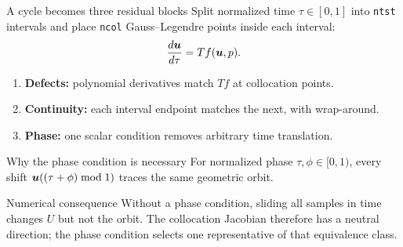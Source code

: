 \begin{frame}{A cycle becomes three residual blocks}
Split normalized time $\tau\in[0,1]$ into \texttt{ntst} intervals and place
\texttt{ncol} Gauss--Legendre points inside each interval:
\[
  \frac{d\bm{u}}{d\tau}=T f(\bm{u},p).
\]
\begin{center}
\end{center}
\begin{enumerate}
  \item \textbf{Defects:} polynomial derivatives match $T f$ at collocation points.
  \item \textbf{Continuity:} each interval endpoint matches the next, with wrap-around.
  \item \textbf{Phase:} one scalar condition removes arbitrary time translation.
\end{enumerate}
\end{frame}

\begin{frame}{Why the phase condition is necessary}
For normalized phase $\tau,\phi\in[0,1)$, every shift
$\bm{u}((\tau+\phi)\bmod 1)$ traces the same geometric orbit.
\begin{center}
\end{center}
\begin{block}{Numerical consequence}
Without a phase condition, sliding all samples in time changes $U$ but not
the orbit. The collocation Jacobian therefore has a neutral direction; the
phase condition selects one representative of that equivalence class.
\end{block}
\end{frame}

